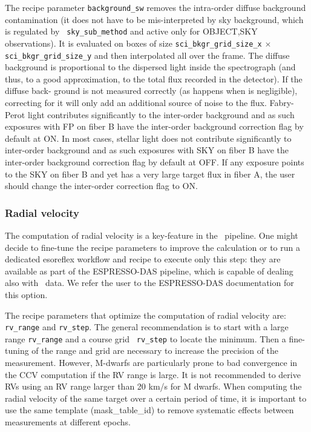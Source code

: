 The recipe parameter {\tt background\_sw} removes the intra-order
diffuse background contamination (it does not have to be
mis-interpreted by sky background, which is regulated by {\tt
  sky\_sub\_method} and active only for OBJECT,SKY observations). It
is evaluated on boxes of size {\tt sci\_bkgr\_grid\_size\_x} $\times$
{\tt sci\_bkgr\_grid\_size\_y} and then interpolated all over the
frame. The diffuse background is proportional to the dispersed light
inside the spectrograph (and thus, to a good approximation, to the
total flux recorded in the detector). If the diffuse back- ground is
not measured correctly (as happens when is negligible), correcting for
it will only add an additional source of noise to the
flux. Fabry-Perot light contributes significantly to the inter-order
background and as such exposures with FP on fiber B have the
inter-order background correction flag by default at ON. In most
cases, stellar light does not contribute significantly to inter-order
background and as such exposures with SKY on fiber B have the
inter-order background correction flag by default at OFF. If any
exposure points to the SKY on fiber B and yet has a very large target
flux in fiber A, the user should change the inter-order correction
flag to ON.

\subsubsection{Radial velocity}
The computation of radial velocity is a key-feature in the
\pipename\ pipeline. One might decide to fine-tune the recipe
parameters to improve the calculation or to run a dedicated esoreflex
workflow and recipe to execute only this step: they are available as
part of the ESPRESSO-DAS pipeline, which is capable of dealing also
with \instname\ data. We refer the user to the ESPRESSO-DAS
documentation for this option.

The recipe parameters that optimize the computation of radial velocity
are: {\tt rv\_range} and {\tt rv\_step}.  The general recommendation is
to start with a large range {\tt rv\_range} and a course grid {\tt
  rv\_step} to locate the minimum. Then a fine-tuning of the range and
grid are necessary to increase the precision of the measurement.
However, M-dwarfs are particularly prone to bad convergence in the CCV
computation if the RV range is large.  It is not recommended to derive
RVs using an RV range larger than 20 km/s for M dwarfs.  When
computing the radial velocity of the same target over a certain period
of time, it is important to use the same template (mask\_table\_id) to
remove systematic effects between measurements at different epochs.

